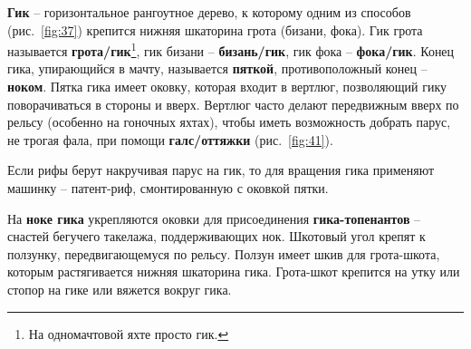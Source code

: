 \documentclass[a4paper, 12pt, twoside, final]{scrbook}
\begin{document}
\textbf{Гик} \--- горизонтальное рангоутное дерево, к которому одним из способов
(рис.~\ref{fig:37})
крепится нижняя шкаторина грота (бизани, фока). Гик грота называется
\textbf{грота\-/гик}\footnote{На одномачтовой яхте просто гик.},
гик бизани \--- \textbf{бизань\-/гик}, гик фока \--- \textbf{фока\-/гик}. Конец гика, упирающийся в мачту, называется \textbf{пяткой}, противоположный
конец \--- \textbf{ноком}. Пятка гика имеет оковку, которая входит в
вертлюг, позволяющий гику поворачиваться в стороны и вверх. Вертлюг
часто делают передвижным вверх по рельсу (особенно на гоночных яхтах),
чтобы иметь возможность добрать парус, не трогая фала, при помощи
\textbf{галс\-/оттяжки} (рис.~\ref{fig:41}).

Если рифы берут накручивая парус на гик, то для вращения гика применяют
машинку \--- патент-риф, смонтированную с оковкой пятки.

На \textbf{ноке гика} укрепляются оковки для присоединения \textbf{гика-топенантов}
\--- снастей бегучего такелажа, поддерживающих нок. Шкотовый угол крепят
к ползунку, передвигающемуся по рельсу. Ползун имеет шкив для грота-шкота,
которым растягивается нижняя шкаторина гика. Грота-шкот крепится на
утку или стопор на гике или вяжется вокруг гика.
\end{document}

